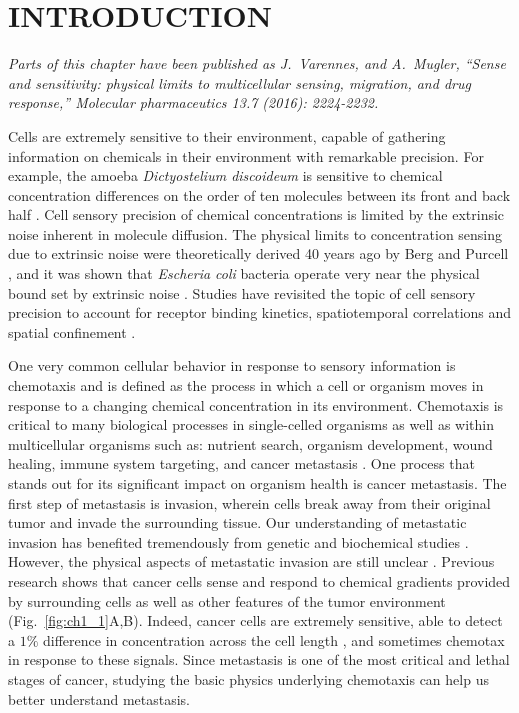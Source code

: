 
\chapter{INTRODUCTION}

\textit{Parts of this chapter have been published as J.\ Varennes, and A.\ Mugler, ``Sense and sensitivity: physical limits to multicellular sensing, migration, and drug response,'' Molecular pharmaceutics 13.7 (2016): 2224-2232.}
\vspace{5mm}

\noindent
Cells are extremely sensitive to their environment, capable of gathering information on chemicals in their environment with remarkable precision. For example, the amoeba \textit{Dictyostelium discoideum} is sensitive to chemical concentration differences on the order of ten molecules between its front and back half \cite{song2006dictyostelium}. Cell sensory precision of chemical concentrations is limited by the extrinsic noise inherent in molecule diffusion. The physical limits to concentration sensing due to extrinsic noise were theoretically derived 40 years ago by Berg and Purcell \cite{berg1977physics}, and it was shown that \textit{Escheria coli} bacteria operate very near the physical bound set by extrinsic noise \cite{lan2012energy}. Studies have revisited the topic of cell sensory precision to account for receptor binding kinetics, spatiotemporal correlations and spatial confinement
\cite{bialek2005physical, kaizu2014berg, bicknell2015limits}.

One very common cellular behavior in response to sensory information is chemotaxis and is defined as the process in which a cell or organism moves in response to a changing chemical concentration in its environment. Chemotaxis is critical to many biological processes in single-celled organisms as well as within multicellular organisms such as: nutrient search, organism development, wound healing, immune system targeting, and cancer metastasis \cite{iglesias2008navigating,roussos2011chemotaxis}.
One process that stands out for its significant impact on organism health is cancer metastasis. The first step of metastasis is invasion, wherein cells break away from their original tumor and invade the surrounding tissue. Our understanding of metastatic invasion has benefited tremendously from genetic and biochemical studies \cite{leber2009molecular, hanahan2000hallmarks, hanahan2011hallmarks}. However, the physical aspects of metastatic invasion are still unclear \cite{hanahan2011hallmarks}. Previous research shows that cancer cells sense and respond to chemical gradients provided by surrounding cells
\cite{bhowmick2004stromal, condeelis2006macrophages, shields2007autologous, puliafito2015three} as well as other features of the tumor environment
\cite{shields2007autologous, polacheck2011interstitial, shieh2011regulation} (Fig.\ \ref{fig:ch1_1}A,B). Indeed, cancer cells are extremely sensitive, able to detect a $1\%$ difference in concentration across the cell length
\cite{shields2007autologous}, and sometimes chemotax in response to these signals. Since metastasis is one of the most critical and lethal stages of cancer, studying the basic physics underlying chemotaxis can help us better understand metastasis.

